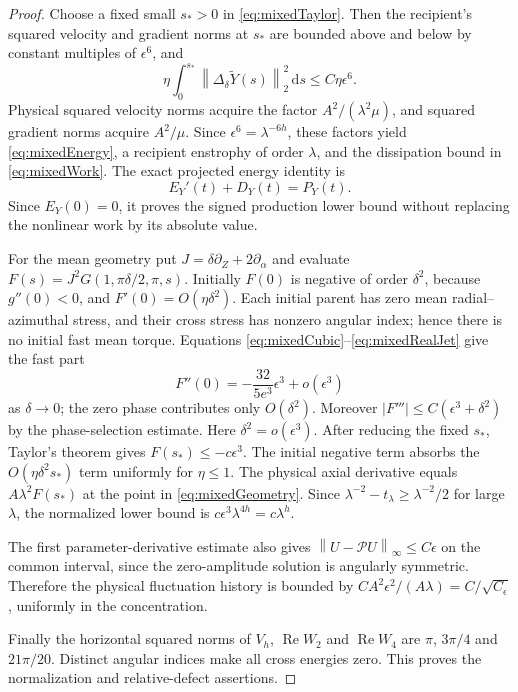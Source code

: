 \documentclass[11pt]{article}
\theoremstyle{remark}
\newcommand{\PP}{\mathcal P}
\newcommand{\dd}{\,\mathrm d}
\newcommand{\norm}[1]{\left\lVert#1\right\rVert}
\begin{document}
\begin{proof}
Choose a fixed small $s_*>0$ in \eqref{eq:mixedTaylor}. Then the
recipient's squared velocity and gradient norms at $s_*$ are bounded
above and below by constant multiples of $\epsilon^6$, and
\[
 \eta\int_0^{s_*}\norm{\Delta_\delta\widetilde Y(s)}_2^2\dd s
                                             \leq C\eta\epsilon^6.
\]
Physical squared velocity norms acquire the factor
$A^2/(\lambda^2\mu)$, and squared gradient norms acquire $A^2/\mu$.
Since $\epsilon^6=\lambda^{-6h}$, these factors yield
\eqref{eq:mixedEnergy}, a recipient enstrophy of order $\lambda$,
and the dissipation bound in \eqref{eq:mixedWork}.
The exact projected energy identity is
\[
 E_Y'(t)+D_Y(t)=P_Y(t).
\]
Since $E_Y(0)=0$, it proves the signed production lower bound without
replacing the nonlinear work by its absolute value.

For the mean geometry put $J=\delta\partial_Z+2\partial_\alpha$
and evaluate $F(s)=J^2G(1,\pi\delta/2,\pi,s)$.
Initially $F(0)$ is negative of order $\delta^2$, because $g''(0)<0$,
and $F'(0)=O(\eta\delta^2)$. Each initial parent has zero mean
radial--azimuthal stress, and their cross stress has nonzero angular
index; hence there is no initial fast mean torque. Equations
\eqref{eq:mixedCubic}--\eqref{eq:mixedRealJet} give the fast part
\[
 F''(0)=-\frac{32}{5e^3}\epsilon^3+o(\epsilon^3)
\]
as $\delta\to0$; the zero phase contributes only $O(\delta^2)$.
Moreover $|F'''|\leq C(\epsilon^3+\delta^2)$ by the phase-selection
estimate. Here $\delta^2=o(\epsilon^3)$.
After reducing the fixed $s_*$, Taylor's theorem gives
$F(s_*)\leq-c\epsilon^3$. The initial negative term absorbs the
$O(\eta\delta^2s_*)$ term uniformly for $\eta\leq1$.
The physical axial derivative equals $A\lambda^2 F(s_*)$ at the
point in \eqref{eq:mixedGeometry}. Since
$\lambda^{-2}-t_\lambda\geq\lambda^{-2}/2$ for large $\lambda$,
the normalized lower bound is
$c\epsilon^3\lambda^{4h}=c\lambda^h$.

The first parameter-derivative estimate also gives
$\norm{U-\PP U}_\infty\leq C\epsilon$ on the common interval,
since the zero-amplitude solution is angularly symmetric. Therefore
the physical fluctuation history is bounded by
$CA^2\epsilon^2/(A\lambda)
=C/\sqrt{C_\epsilon}$, uniformly in the concentration.

Finally the horizontal squared norms of $V_h$, $\operatorname{Re}W_2$
and $\operatorname{Re}W_4$ are $\pi$, $3\pi/4$ and $21\pi/20$.
Distinct angular indices make all cross energies zero. This proves
the normalization and relative-defect assertions.
\end{proof}
\end{document}

